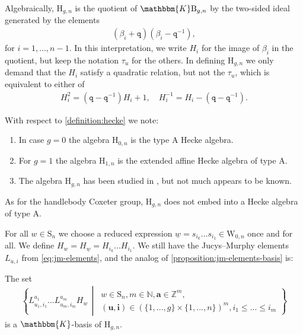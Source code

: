 \documentclass[a4paper,11pt]{amsart}
\renewcommand{\dots}{\text{...}}
\newcommand{\setstuff}[1]{\mathrm{#1}}
\newcommand{\Z}{\mathbb{Z}}
\newcommand{\KK}{\mathbbm{K}}
\newcommand{\N}{\mathbb{N}}
\newcommand{\bsym}[1]{\boldsymbol{#1}}
\newcommand{\varsym}[1]{\mathtt{#1}}
\newcommand{\jm}{L}
\newcommand{\qvar}{\varsym{q}}
\numberwithin{equation}{section}
\let\fullref\autoref
\begin{document}
Algebraically, 
$\setstuff{H}_{g,n}$ is the quotient 
of $\KK\setstuff{B}_{g,n}$ by the two-sided ideal generated by the elements
\begin{gather*}
(\beta_{i}+\qvar)(\beta_{i}-\qvar^{-1}), 
\end{gather*}
for $i=1,\dots,n-1$.
In this interpretation, we write $H_{i}$ for the image of 
$\beta_{i}$ in the quotient, but keep the notation $\tau_{u}$ for the others.
In defining $\setstuff{H}_{g,n}$ we only demand that
the $H_{i}$ satisfy a quadratic relation, but not the $\tau_{u}$, which 
is equivalent to either of
\begin{gather*}
H_{i}^{2}=(\qvar-\qvar^{-1})H_{i}+1,
\quad
H_{i}^{-1}=H_{i}-(\qvar-\qvar^{-1}).
\end{gather*}

\begin{remark}\label{remark:hecke}
With respect to \fullref{definition:hecke} we note:	
\begin{enumerate}

\item In case $g=0$ the algebra $\setstuff{H}_{0,n}$ is the type A Hecke algebra.

\item For $g=1$ the algebra $\setstuff{H}_{1,n}$ is the extended affine Hecke algebra of type A. 

\item The algebra $\setstuff{H}_{g,n}$  
has been studied in \cite{Ba-braid-handlebodies}, 
but not much appears to be known.
\end{enumerate}
As for the handlebody Coxeter group, 
$\setstuff{H}_{g,n}$ does not embed into 
a Hecke algebra of type A. 
\end{remark}

For all $w\in\setstuff{S}_{n}$ we choose a 
reduced expression $\underline{w}=s_{i_{k}}\dots 
s_{i_{1}}\in\setstuff{W}_{0,n}$ 
once and for all. We define $H_{w}=H_{\underline{w}}=H_{i_{k}}\dots H_{i_{1}}$. 
We still have the Jucys--Murphy elements $\jm_{u,i}$ 
from \eqref{eq:jm-elements}, and the analog of \fullref{proposition:jm-elements-basis} is:

\begin{proposition}\label{proposition:heckejm-elements-basis}
The set
\begin{gather}\label{eq:jm-basis-hecke1}
\left\{ 
\jm_{u_{1},i_{1}}^{a_{1}}\dots 
\jm_{u_{m},i_{m}}^{a_{m}}H_{w} 
\,\middle\vert\,
\begin{gathered}
w\in\setstuff{S}_{n},
m\in\N,
\bsym{a}\in\Z^{m},
\\
(\bsym{u},\bsym{i})\in(\{1,\dots,g\}\times\{1,\dots,n\})^{m},
i_{1}\leq\dots\leq i_{m}
\end{gathered}
\right\}
\end{gather}
is a $\KK$-basis of $\setstuff{H}_{g,n}$.
\end{proposition}
\end{document}
